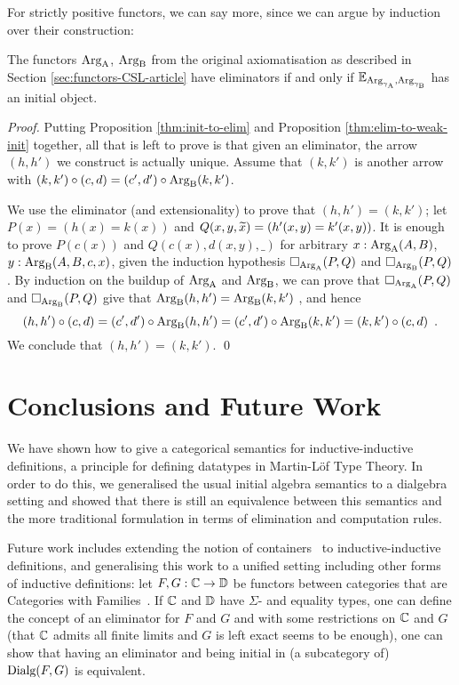 \documentclass[orivec,envcountsame, ,envcountsect]{llncs}
\begin{document}
For strictly positive functors, we can say more, since we can argue by
induction over their construction:

\label{sec:elim-init-equiv-CSL}
\begin{theorem}
\label{thm:equiv-init-elim}
The functors $\text{Arg}_{\text{A}}$, $\text{Arg}_{\text{B}}$ from the original axiomatisation as
described in Section \ref{sec:functors-CSL-article} have eliminators
if and only if $\mathbb{E}_{\text{Arg}_{\gamma_\text{A}}, \text{Arg}_{\gamma_\text{B}}}$ has an initial object.
\end{theorem}
\begin{proof}
Putting Proposition
  \ref{thm:init-to-elim} and Proposition \ref{thm:elim-to-weak-init}
  together, all that is left to prove is that given an eliminator, the
  arrow $(h, h')$ we construct is actually unique. Assume that $(k,
  k')$ is another arrow with $(k, k') \circ (c, d) = (c', d') \circ
  \text{Arg}_{\text{B}}(k, k')$.

  We use the eliminator (and extensionality) to prove that $(h, h') =
  (k ,k')$; let $P(x) = (h(x) = k(x))$ and $Q(x, y, \widetilde{x})
  = (h'(x, y) = k'(x, y))$. It is enough to prove $P(c(x))$ and
  $Q(c(x), d(x, y), \_)$ for arbitrary $x : \text{Arg}_{\text{A}}(A, B)$, $y :
  \text{Arg}_{\text{B}}(A, B, c, x)$, given the induction hypothesis $\Box_{\text{Arg}_{\text{A}}}(P,
  Q)$ and $\Box_{\text{Arg}_{\text{B}}}(P, Q)$.
By induction on the buildup of $\text{Arg}_{\text{A}}$ and $\text{Arg}_{\text{B}}$, we can prove that 
$\Box_{\text{Arg}_{\text{A}}}(P,  Q)$ and $\Box_{\text{Arg}_{\text{B}}}(P, Q)$ give that
$\text{Arg}_{\text{B}}(h, h') =  \text{Arg}_{\text{B}}(k, k')$ , and hence
  \[
  (h, h') \circ (c, d) = (c', d') \circ \text{Arg}_{\text{B}}(h, h')
                       = (c', d') \circ \text{Arg}_{\text{B}}(k, k')
                       = (k, k') \circ (c, d) \enspace .
  \]
  We conclude that $(h, h') =  (k ,k')$. \qed
\end{proof}
\section{Conclusions and Future Work}

We have shown how to give a categorical semantics for
inductive-inductive definitions, a principle for defining datatypes in
Martin-L\"of Type Theory. In order to do this, we generalised the
usual initial algebra semantics to a dialgebra setting and showed that
there is still an equivalence between this semantics and the more
traditional formulation in terms of elimination and computation rules.

Future work includes extending the notion of
containers~\cite{abbottAltenkirchGhani2005containers} to
inductive-inductive definitions, and generalising this work to a
unified setting including other forms of inductive definitions: let
$F, G: \mathbb{C} \to \mathbb{D}$ be functors between categories that are Categories
with Families~\cite{dybjer1996internalTT,hofmann1997syntaxsemantics}.
If $\mathbb{C}$ and $\mathbb{D}$ have $\Sigma$- and equality types, one can define the
concept of an eliminator for $F$ and $G$ and with some restrictions on
$\mathbb{C}$ and $G$ (that $\mathbb{C}$ admits all finite limits and $G$ is left exact
seems to be enough), one can show that having an eliminator and being
initial in (a subcategory of) $\text{Dialg}(F, G)$ is equivalent.
\end{document}
